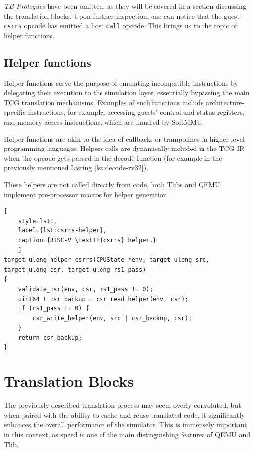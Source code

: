 \noindent
\textit{TB Prologues} have been omitted, as they will be covered in a section discussing the translation blocks.
Upon further inspection, one can notice that the guest \texttt{csrrs} opcode has emitted a host \texttt{call} opcode.
This brings us to the topic of helper functions.

\pagebreak
\subsection{Helper functions}

Helper functions serve the purpose of emulating incompatible instructions by delegating their execution to the
simulation layer, essentially bypassing the main TCG translation mechanisms. Examples of such functions include
architecture-specific instructions, for example, accessing guests' control and status registers, and memory access
instructions, which are handled by SoftMMU.

Helper functions are akin to the idea of callbacks or trampolines in higher-level programming languages. Helpers calls
are dynamically included in the TCG IR when the opcode gets parsed in the decode function (for example in the previously
mentioned Listing \ref{lst:decode-rv32}).

These helpers are not called directly from code, both Tlibs and QEMU implement pre-processor macros for helper generation.


\begin{lstlisting}[
    style=lstC,
    label={lst:csrrs-helper},
    caption={RISC-V \texttt{csrrs} helper.}
    ]
target_ulong helper_csrrs(CPUState *env, target_ulong src, target_ulong csr, target_ulong rs1_pass)
{
    validate_csr(env, csr, rs1_pass != 0);
    uint64_t csr_backup = csr_read_helper(env, csr);
    if (rs1_pass != 0) {
        csr_write_helper(env, src | csr_backup, csr);
    }
    return csr_backup;
}
\end{lstlisting}

\section{Translation Blocks}

The previously described translation process may seem overly convoluted, but when paired with the ability to cache and
reuse translated code, it significantly enhances the overall performance of the simulator. This is immensely important
in this context, as speed is one of the main distinguishing features of QEMU and Tlib.

